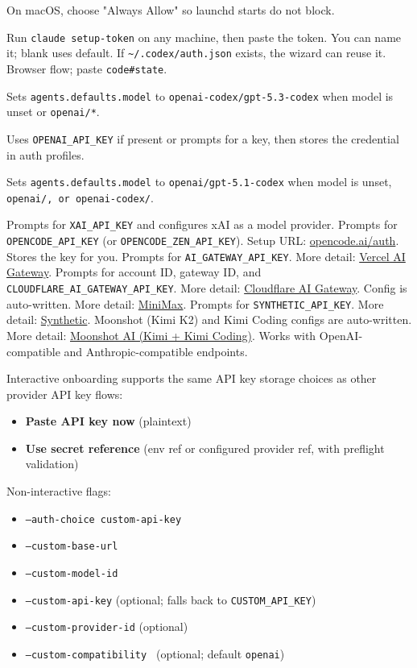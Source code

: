 On macOS, choose "Always Allow" so launchd starts do not block.

Run \texttt{claude setup-token} on any machine, then paste the token.
You can name it; blank uses default.
If \texttt{\textasciitilde{}/.codex/auth.json} exists, the wizard can reuse it.
Browser flow; paste \texttt{code\#state}.

Sets \texttt{agents.defaults.model} to \texttt{openai-codex/gpt-5.3-codex} when model is unset or \texttt{openai/*}.

Uses \texttt{OPENAI\_API\_KEY} if present or prompts for a key, then stores the credential in auth profiles.

Sets \texttt{agents.defaults.model} to \texttt{openai/gpt-5.1-codex} when model is unset, \texttt{openai/\textit{}, or \texttt{openai-codex/}}.

Prompts for \texttt{XAI\_API\_KEY} and configures xAI as a model provider.
Prompts for \texttt{OPENCODE\_API\_KEY} (or \texttt{OPENCODE\_ZEN\_API\_KEY}).
Setup URL: \href{https://opencode.ai/auth}{opencode.ai/auth}.
Stores the key for you.
Prompts for \texttt{AI\_GATEWAY\_API\_KEY}.
More detail: \href{/providers/vercel-ai-gateway}{Vercel AI Gateway}.
Prompts for account ID, gateway ID, and \texttt{CLOUDFLARE\_AI\_GATEWAY\_API\_KEY}.
More detail: \href{/providers/cloudflare-ai-gateway}{Cloudflare AI Gateway}.
Config is auto-written.
More detail: \href{/providers/minimax}{MiniMax}.
Prompts for \texttt{SYNTHETIC\_API\_KEY}.
More detail: \href{/providers/synthetic}{Synthetic}.
Moonshot (Kimi K2) and Kimi Coding configs are auto-written.
More detail: \href{/providers/moonshot}{Moonshot AI (Kimi + Kimi Coding)}.
Works with OpenAI-compatible and Anthropic-compatible endpoints.

Interactive onboarding supports the same API key storage choices as other provider API key flows:
\begin{itemize}
  \item \textbf{Paste API key now} (plaintext)
  \item \textbf{Use secret reference} (env ref or configured provider ref, with preflight validation)
\end{itemize}


Non-interactive flags:
\begin{itemize}
  \item \texttt{--auth-choice custom-api-key}
  \item \texttt{--custom-base-url}
  \item \texttt{--custom-model-id}
  \item \texttt{--custom-api-key} (optional; falls back to \texttt{CUSTOM\_API\_KEY})
  \item \texttt{--custom-provider-id} (optional)
  \item \texttt{--custom-compatibility } (optional; default \texttt{openai})
\end{itemize}


